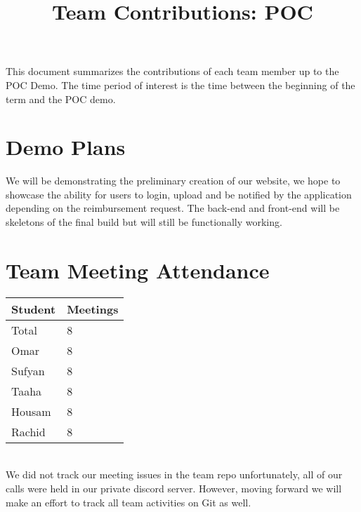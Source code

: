 \documentclass{article}
\title{Team Contributions: POC\\\progname}
\author{\authname}
\date{}
\begin{document}
\maketitle

This document summarizes the contributions of each team member up to the POC
Demo.  The time period of interest is the time between the beginning of the term
and the POC demo.

\section{Demo Plans}

We will be demonstrating the preliminary creation of our website, we hope to showcase the ability for users to login, upload and be notified by the application depending on the reimbursement request. The back-end and front-end will be skeletons of the final build but will still be functionally working. 

\section{Team Meeting Attendance}


\begin{table}[H]
\centering
\begin{tabular}{ll}
\toprule
\textbf{Student} & \textbf{Meetings}\\
\midrule
Total & 8\\
Omar & 8\\
Sufyan & 8\\
Taaha & 8\\
Housam & 8\\
Rachid & 8\\
\bottomrule
\end{tabular}
\end{table}

 \\
We did not track our meeting issues in the team repo unfortunately, all of our calls were held in our private discord server. However, moving forward we will make an effort to track all team activities on Git as well. 
\end{document}
